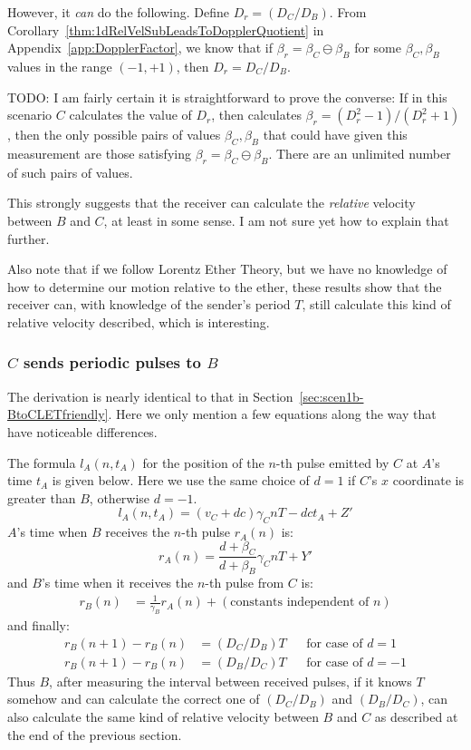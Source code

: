 \documentclass[a4paper]{article}
\theoremstyle{plain}
\theoremstyle{definition}
\begin{document}
However, it {\em can} do the following.  Define $D_r = (D_C / D_B)$.
From Corollary~\ref{thm:1dRelVelSubLeadsToDopplerQuotient} in
Appendix~\ref{app:DopplerFactor}, we know that if
$\beta_r = \beta_C \ominus \beta_B$ for some $\beta_C, \beta_B$ values
in the range $(-1, +1)$, then $D_r = D_C / D_B$.

TODO: I am fairly certain it is straightforward to prove the converse:
If in this scenario $C$ calculates the value of $D_r$, then
calculates $\beta_r = (D_r^2-1)/(D_r^2+1)$, then the only possible
pairs of values $\beta_C, \beta_B$ that could have given this
measurement are those satisfying $\beta_r = \beta_C \ominus \beta_B$.
There are an unlimited number of such pairs of values.

This strongly suggests that the receiver can calculate the
{\em relative} velocity between $B$ and $C$, at least in some sense.
I am not sure yet how to explain that further.

Also note that if we follow Lorentz Ether Theory, but we have no
knowledge of how to determine our motion relative to the ether, these
results show that the receiver can, with knowledge of the sender's
period $T$, still calculate this kind of relative velocity described,
which is interesting.


\subsubsection{$C$ sends periodic pulses to $B$}
\label{sec:scen1b-CtoBLETfriendly}

The derivation is nearly identical to that in
Section~\ref{sec:scen1b-BtoCLETfriendly}.
Here we only mention a few equations along the way that have
noticeable differences.

The formula $l_A(n,t_A)$ for the position of the $n$-th pulse emitted
by $C$ at $A$'s time $t_A$ is given below.
Here we use the same choice of $d=1$ if $C$'s $x$ coordinate is
greater than $B$, otherwise $d=-1$.
\begin{equation}
l_A(n, t_A) = (v_C + dc) \gamma_C nT - dc t_A + Z'
\end{equation}
$A$'s time when $B$ receives the $n$-th pulse $r_A(n)$ is:
\begin{equation}
r_A(n) = \frac{d + \beta_C}{d + \beta_B} \gamma_C nT + Y'
\end{equation}
and $B$'s time when it receives the $n$-th pulse from $C$ is:
\begin{align*}
r_B(n) & = \frac{1}{\gamma_B} r_A(n) + (\text{constants independent of $n$})
\end{align*}
and finally:
\begin{align*}
r_B(n+1) - r_B(n)
       & = ( D_C / D_B ) T & & \text{for case of $d=1$} \\
r_B(n+1) - r_B(n)
       & = ( D_B / D_C ) T & & \text{for case of $d=-1$}
\end{align*}
Thus $B$, after measuring the interval between received pulses, if it
knows $T$ somehow and can calculate the correct one of $(D_C / D_B)$
and $(D_B / D_C)$, can also calculate the same kind of relative
velocity between $B$ and $C$ as described at the end of the previous
section.
\end{document}
